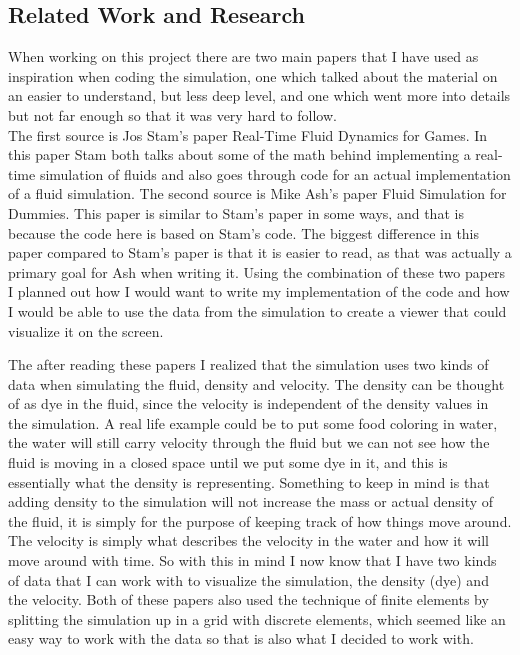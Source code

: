 \documentclass{article}
\begin{document}
\begin{multicols}{2}
\section{Related Work and Research}
When working on this project there are two main papers that I have used as inspiration when coding the simulation, one which talked about the material on an easier to understand, but less deep level, and one which went more into details but not far enough so that it was very hard to follow.\\
The first source is Jos Stam's paper Real-Time Fluid Dynamics for Games. In this paper Stam both talks about some of the math behind implementing a real-time simulation of fluids and also goes through code for an actual implementation of a fluid simulation. The second source is Mike Ash's paper Fluid Simulation for Dummies. This paper is similar to Stam's paper in some ways, and that is because the code here is based on Stam's code. The biggest difference in this paper compared to Stam's paper is that it is easier to read, as that was actually a primary goal for Ash when writing it. Using the combination of these two papers I planned out how I would want to write my implementation of the code and how I would be able to use the data from the simulation to create a viewer that could visualize it on the screen.

The after reading these papers I realized that the simulation uses two kinds of data when simulating the fluid, density and velocity. The density can be thought of as dye in the fluid, since the velocity is independent of the density values in the simulation. A real life example could be to put some food coloring in water, the water will still carry velocity through the fluid but we can not see how the fluid is moving in a closed space until we put some dye in it, and this is essentially what the density is representing. Something to keep in mind is that adding density to the simulation will not increase the mass or actual density of the fluid, it is simply for the purpose of keeping track of how things move around. The velocity is simply what describes the velocity in the water and how it will move around with time. So with this in mind I now know that I have two kinds of data that I can work with to visualize the simulation, the density (dye) and the velocity. Both of these papers also used the technique of finite elements by splitting the simulation up in a grid with discrete elements, which seemed like an easy way to work with the data so that is also what I decided to work with.


\end{multicols}
\end{document}
